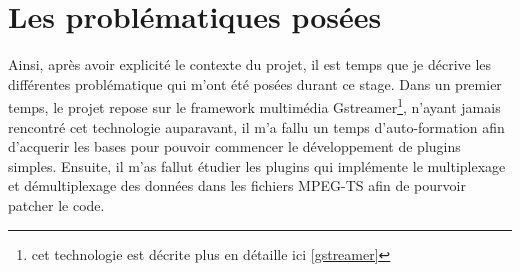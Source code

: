 \chapter{Les problématiques posées}
Ainsi, après avoir explicité le contexte du projet, il est temps que je décrive les différentes problématique qui m'ont été posées durant ce stage. Dans un premier temps, le projet repose sur le framework multimédia Gstreamer\footnote{cet technologie est décrite plus en détaille ici \ref{gstreamer}}, n'ayant jamais rencontré cet technologie auparavant, il m'a fallu un temps  	d'auto-formation afin d'acquerir les bases pour pouvoir commencer le développement de plugins simples. Ensuite, il m'as fallut étudier les plugins qui implémente le multiplexage et démultiplexage des données dans les fichiers MPEG-TS afin de pourvoir patcher le code.